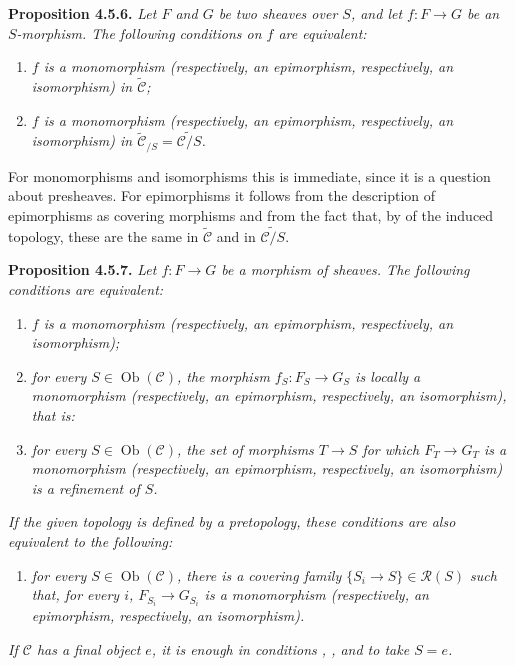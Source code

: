 
\medskip
\noindent{}\textbf{Proposition 4.5.6.}
\textit{Let \(F\) and \(G\) be two sheaves over \(S\), and let
\(f:F\to G\) be an \(S\)-morphism. The following conditions on \(f\) are
equivalent:}
\begin{enumerate}
  \item[(i)] \textit{\(f\) is a monomorphism (respectively, an
    epimorphism, respectively, an isomorphism) in
    \(\widetilde{\mathscr C}\);}
  \item[(ii)] \textit{\(f\) is a monomorphism (respectively, an
    epimorphism, respectively, an isomorphism) in
    \(\widetilde{\mathscr C}_{/S}=\widetilde{\mathscr C/S}\).}
\end{enumerate}

For monomorphisms and isomorphisms this is immediate, since it is a
question about presheaves. For epimorphisms it follows from the description
of epimorphisms as covering morphisms and from the fact that, by  of the induced topology, these are the same in
\(\widetilde{\mathscr C}\) and in \(\widetilde{\mathscr C/S}\).

\medskip
\noindent{}\textbf{Proposition 4.5.7.}
\textit{Let \(f:F\to G\) be a morphism of sheaves. The following conditions
are equivalent:}
\begin{enumerate}
  \item[(i)] \textit{\(f\) is a monomorphism (respectively, an
    epimorphism, respectively, an isomorphism);}
  \item[(ii)] \textit{for every \(S\in\operatorname{Ob}(\mathscr C)\),
    the morphism \(f_S:F_S\to G_S\) is locally a monomorphism
    (respectively, an epimorphism, respectively, an isomorphism), that is:}
  \item[(iii)] \textit{for every \(S\in\operatorname{Ob}(\mathscr C)\),
    the set of morphisms \(T\to S\) for which
    \(F_T\to G_T\) is a monomorphism (respectively, an epimorphism,
    respectively, an isomorphism) is a refinement of \(S\).}
\end{enumerate}
\textit{If the given topology is defined by a pretopology, these
conditions are also equivalent to the following:}
\begin{enumerate}
  \item[(iv)] \textit{for every \(S\in\operatorname{Ob}(\mathscr C)\),
    there is a covering family
    \(\{S_i\to S\}\in\mathscr R(S)\) such that, for every \(i\),
    \(F_{S_i}\to G_{S_i}\) is a monomorphism (respectively, an
    epimorphism, respectively, an isomorphism).}
\end{enumerate}
\textit{If \(\mathscr C\) has a final object \(e\), it is enough in
conditions , , and  to take \(S=e\).}

